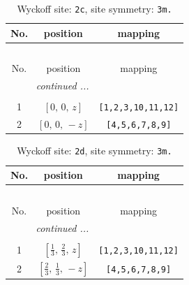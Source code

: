 \documentclass[fleqn,8pt]{jsarticle}
\begin{document}
\begin{longtable}{ccc}
\caption{Wyckoff site: {\tt 2c}, site symmetry: {\tt 3m.}}
 \\
 \hline \hline
No. & position & mapping \\ \hline \endfirsthead

\multicolumn{2}{l}{\tablename\ \thetable{}} \\
 \hline \hline
No. & position & mapping \\ \hline \endhead

 \hline \hline
\multicolumn{2}{r}{\footnotesize\it continued ...} \\ \endfoot

 \hline \hline
\multicolumn{2}{r}{} \\ \endlastfoot

1 & $\left[ 0,\, 0,\, z \right]$ & {\tt [1,2,3,10,11,12]} \\ \hline
2 & $\left[ 0,\, 0,\, - z \right]$ & {\tt [4,5,6,7,8,9]} \\
\end{longtable}
\renewcommand{\arraystretch}{1.2}
\begin{longtable}{ccc}
\caption{Wyckoff site: {\tt 2d}, site symmetry: {\tt 3m.}}
 \\
 \hline \hline
No. & position & mapping \\ \hline \endfirsthead

\multicolumn{2}{l}{\tablename\ \thetable{}} \\
 \hline \hline
No. & position & mapping \\ \hline \endhead

 \hline \hline
\multicolumn{2}{r}{\footnotesize\it continued ...} \\ \endfoot

 \hline \hline
\multicolumn{2}{r}{} \\ \endlastfoot

1 & $\left[ \frac{1}{3},\, \frac{2}{3},\, z \right]$ & {\tt [1,2,3,10,11,12]} \\ \hline
2 & $\left[ \frac{2}{3},\, \frac{1}{3},\, - z \right]$ & {\tt [4,5,6,7,8,9]} \\
\end{longtable}
\renewcommand{\arraystretch}{1.2}
\end{document}
